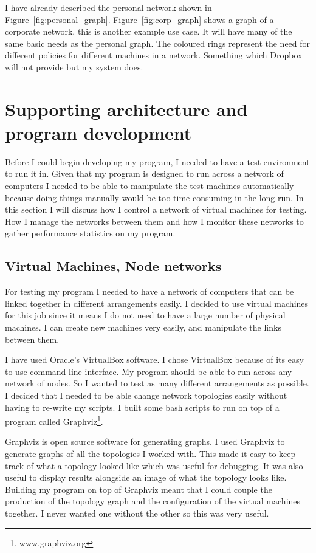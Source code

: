 \documentclass[12pt]{article}
\begin{document}
I have already described the personal network shown in
Figure~\ref{fig:personal_graph}. Figure~\ref{fig:corp_graph}
shows a graph of a corporate network, this
is another example use case. It will have many of the same
basic needs as the personal graph. The coloured rings represent
the need for different policies for different machines in a network.
Something which Dropbox will not provide but my system does.


\newpage
\section{Supporting architecture and program development}
Before I could begin developing my program, I needed to
have a test environment to run it in. Given that my program
is designed to run across a network of computers I needed
to be able to manipulate the test machines automatically
because doing things manually would be too time consuming
in the long run. In this section I will discuss how I
control a network of virtual machines for testing. How
I manage the networks between them and how I monitor
these networks to gather performance statistics on
my program.

\subsection{Virtual Machines, Node networks}
For testing my program I needed to have a network
of computers that can be linked together in different
arrangements easily. I decided to use virtual machines for
this job since it means I do not need to have a large number
of physical machines. I can create new machines very easily,
and manipulate the links between them.

I have used Oracle's VirtualBox software. I chose
VirtualBox because of its easy to use command
line interface.
My program should be able to run across
any network of nodes. So I wanted to test
as many different arrangements as possible.
I decided that I needed to be able change network
topologies easily without having to re-write
my scripts. I built some bash scripts to run on top
of a program called Graphviz\footnote{www.graphviz.org}.

Graphviz is open source software for generating graphs.
I used Graphviz to generate graphs of all the topologies I worked
with. This made it easy to keep track of what a topology looked like
which was useful for debugging. It was also useful to display results
alongside an image of what the topology looks like. Building my
program on top of Graphviz meant that I could couple the production
of the topology graph and the configuration of the virtual machines
together. I never wanted one without the other so this was very useful.
\end{document}
